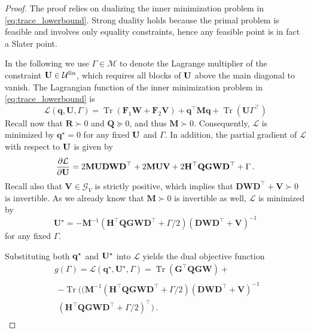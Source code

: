 \documentclass[10pt,a4paper]{amsart}
\DeclareMathOperator{\Tr}{Tr}
\begin{document}
\begin{proof}
The proof relies on dualizing the inner minimization problem in \eqref{eq:trace_lowerbound}. Strong duality holds because the primal problem is feasible and involves only equality constraints, hence any feasible point is in fact a Slater point.

In the following we use $\Gamma \in \mathcal{M}$ to denote the Lagrange multiplier of the constraint $\bf U \in \mathcal{U}^{\text{lin}}$, 
which requires all blocks of $\bf U$ above the main diagonal to vanish. 
\noindent
The Lagrangian function of the inner minimization problem in \eqref{eq:trace_lowerbound} is
\begin{equation*}
\mathcal{L}(\mathbf{q}, \mathbf{U}, \Gamma) 
= \Tr\left(\mathbf{F}_{1} \mathbf{W}+\mathbf{F}_{2} \mathbf{V}\right)+\mathbf{q}^{\top} \mathbf{M} \mathbf{q} + \Tr(\mathbf{U}\Gamma^\top)
\end{equation*}
\noindent
Recall now that $\mathbf{R} \succ 0$ and $\mathbf{Q} \succeq 0$, and thus $\mathbf{M} \succ 0$. 
Consequently, $\mathcal{L}$ is minimized by $\mathbf{q}^{\star} = 0$ for any fixed $\bf U$ and $\Gamma$. 
In addition, the partial gradient of $\mathcal{L}$ with respect to $\bf U$ is given by
\[
\frac{\partial \mathcal{L}}{\partial \bf U}
= 2 \mathbf{M U D W D}^{\top} 
 + 2 \mathbf{M U V}
 + 2 \mathbf{H^\top QGWD^\top} + \Gamma\,.
\]
\noindent
Recall also that $\mathbf{V} \in \mathcal{G}_{V}$ is strictly positive, which implies that $\mathbf{D W D^{\top} }+ \mathbf{V} \succ 0$ is invertible. 
As we already know that $\mathbf{M}\succ 0$ is invertible as well, 
$\mathcal{L}$ is minimized by
\[
\mathbf{U}^{\star} 
= -\mathbf{M}^{-1} 
   (\mathbf{H^{\top} Q G W D^{\top}} + \Gamma/2)
   (\mathbf{D W D^{\top} + V})^{-1}
\]
for any fixed $\Gamma$.

\noindent
Substituting both $\bf q^{\star}$ and $\bf U^{\star}$ into $\mathcal{L}$ yields the dual objective function
\[
\begin{aligned}
&g(\Gamma)
= \mathcal{L}(\mathbf{q^{\star}, U}^{\star}, \Gamma)
= \Tr(\mathbf{G^{\top} Q G W})+
\\
&
\begin{multlined}
- \Tr\Big(
    (\mathbf{M}^{-1}
    (\mathbf{H^{\top} Q G W D^{\top}} + \Gamma/2)
    (\mathbf{D W D^{\top} + V})^{-1}
    \\
    (\mathbf{H^{\top} Q G W D^{\top}} + \Gamma/2)^{\top}
   \Big)\,.
\end{multlined}
\end{aligned}
\]


\end{proof}
\end{document}

